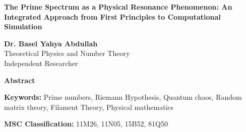 \documentclass[11pt,a4paper]{article}
\newcommand{\GSE}{\text{GSE}}
\newcommand{\GUE}{\text{GUE}}
\begin{document}
\begin{titlepage}
\centering
\vspace*{2cm}

{\Huge\bfseries The Prime Spectrum as a Physical Resonance Phenomenon: An Integrated Approach from First Principles to Computational Simulation}

\vspace{1.5cm}

{\Large\textbf{Dr. Basel Yahya Abdullah}}\\
\vspace{0.5cm}
{\large Theoretical Physics and Number Theory}\\
{\large Independent Researcher}

\vspace{2cm}

{\large\textbf{Abstract}}

\begin{abstract}
The enigmatic distribution of prime numbers, encapsulated by the Riemann Hypothesis, has long been one of mathematics' most profound unsolved problems. The Hilbert-Pólya conjecture suggests a physical origin, linking the non-trivial zeros of the Riemann Zeta function to the eigenvalues of a quantum mechanical operator. This paper introduces \textbf{Filament Theory}, a novel foundational physical framework that explains this connection through orthogonal duality of aggregative (mass) and expansive (space) principles emerging from a dynamic zero-state.

We validate this theory with three independent computational approaches: (1) A phenomenological model (\GSE) that discovers Zeta zero frequencies with $R^2 \approx 0.88$ accuracy when trained on prime-counting data. (2) A first-principles Hamiltonian matrix exhibiting precise Gaussian Unitary Ensemble (\GUE) statistics governing Zeta zeros. (3) Successful mathematical modeling of Zeta zeros' imaginary parts structure. This convergence provides strong evidence for reframing the prime number enigma as a physical phenomenon and offers a concrete candidate for the Hilbert-Pólya operator.
\end{abstract}

\vspace{1cm}

{\large\textbf{Keywords:} Prime numbers, Riemann Hypothesis, Quantum chaos, Random matrix theory, Filament Theory, Physical mathematics}

\vspace{1cm}

{\large\textbf{MSC Classification:} 11M26, 11N05, 15B52, 81Q50}

\end{titlepage}
\end{document}
